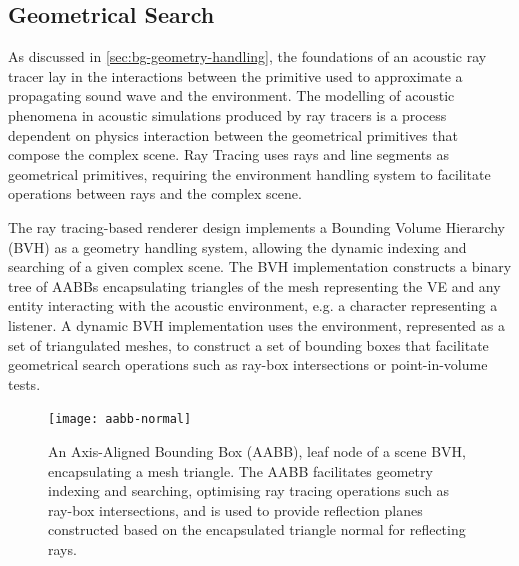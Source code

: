 \subsection{Geometrical Search}
As discussed in \ref{sec:bg-geometry-handling}, the foundations of an acoustic ray tracer lay in the interactions between the primitive used to approximate a propagating sound wave and the environment. The modelling of acoustic phenomena in acoustic simulations produced by ray tracers is a process dependent on physics interaction between the geometrical primitives that compose the complex scene. Ray Tracing uses rays and line segments as geometrical primitives, requiring the environment handling system to facilitate operations between rays and the complex scene.\par
The ray tracing-based renderer design implements a Bounding Volume Hierarchy (BVH) as a geometry handling system, allowing the dynamic indexing and searching of a given complex scene. The BVH implementation constructs a binary tree of AABBs encapsulating triangles of the mesh representing the VE and any entity interacting with the acoustic environment, e.g. a character representing a listener. 
A dynamic BVH implementation uses the environment, represented as a set of triangulated meshes, to construct a set of bounding boxes that facilitate geometrical search operations such as ray-box intersections or point-in-volume tests. \par
\begin{figure}[h]
    \centering
    \texttt{[image: aabb-normal]}
    \caption{An Axis-Aligned Bounding Box (AABB), leaf node of a scene BVH, encapsulating a mesh triangle. The AABB facilitates geometry indexing and searching, optimising ray tracing operations such as ray-box intersections, and is used to provide reflection planes constructed based on the encapsulated triangle normal for reflecting rays.}
    \label{fig:aabb-normal}
\end{figure}

